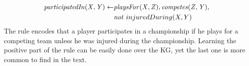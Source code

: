 \begin{align*}
\mathit{participatedIn(X,Y)} \leftarrow & \mathit{playsFor(X,Z)}, \mathit{competes(Z,Y)},\\ & \mathit{not}~ injuredDuring(X,Y)
\end{align*}
The rule encodes that a player participates in a championship if he plays for a competing team unless he was injured during the championship. Learning the positive part of the rule can be easily done over the KG, yet the last one is more common to find in the text. 





